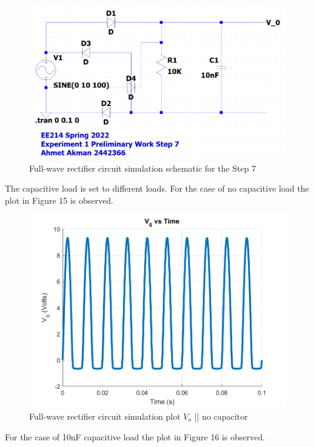 \documentclass[letterpaper,12pt]{article}
\begin{document}
\begin{figure}[H]
    \centering
   \includegraphics[width=1\textwidth]{7SCH.png}
   \caption{Full-wave rectifier circuit simulation schematic for the Step 7}
\end{figure} 
The capacitive load is set to different loads. For the case of no capacitive load the plot in Figure 15 is observed.  
\begin{figure}[H]
    \centering
   \includegraphics[width=1\textwidth]{7_empty.png}
   \caption{Full-wave rectifier circuit simulation plot \(V_o\) || no capacitor }
\end{figure} 
For the case of 10nF capacitive load the plot in Figure 16 is observed.
\end{document}
